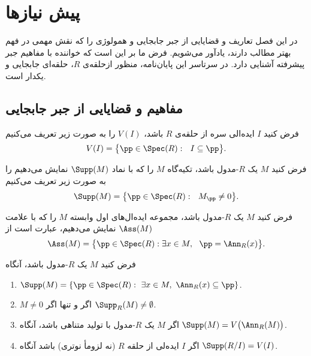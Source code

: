 \chapter{پیش نیازها}
\thispagestyle{empty}
\newpage
در اين فصل تعاریف و قضایایی از جبر جابجایی و همولوژی را که نقش مهمی در فهم بهتر مطالب دارند، یادآور می‌شویم. فرض ما بر این است که خواننده با مفاهیم جبر پیشرفته آشنایی دارد. در سرتاسر اين پايان‌نامه، منظور ازحلقه‌ی
$R$،
حلقه‌ای جابجایی و يكدار است.
\section{{مفاهیم و قضایایی از جبر جابجایی}}
\begin{definition}
فرض کنید $I$ ایده‌الی سره از حلقه‌ی $R$ باشد، $V(I)$ را به صورت زیر تعریف می‌کنیم
$$ V(I)=\big\{{\pp}\in\Spec(R): ~~I\subseteq {\pp}\big\}.$$
\end{definition}
\begin{definition}
فرض کنید $M$ یک $R$-مدول باشد، تکیه‌گاه
$M$
را که با نماد $\Supp(M)$ نمایش می‌دهیم را به صورت زیر تعریف می‌کنیم
$$\Supp(M)=\big\{{\pp}\in \Spec(R): ~~ M_{{\pp}} \neq 0\big\}.$$
\end{definition}
\begin{definition}
فرض کنید $M$ یک $R$-مدول باشد، مجموعه ایده‌ال‌های اول وابسته
$M$
را که با علامت $\Ass(M)$ نمایش می‌دهیم، عبارت است از
$$\Ass(M)=\big\{{\pp}\in \Spec(R): \exists x \in M,~~ {\pp}=\Ann_R(x)\big\}.$$
\end{definition}
\begin{lemma}\label{supp}
فرض کنید $M$ یک $R$‌-‌مدول باشد، آنگاه
\begin{enumerate}
\item
$\Supp(M)=\left\{{\pp}\in \Spec(R):~\exists x\in M,~ \Ann_R(x)\subseteq {\pp}\right\}$.
\item
$M\neq 0$
اگر و تنها اگر $\Supp_R(M)\neq \emptyset$.
\item
اگر $M$ یک $R$-مدول با تولید متناهی باشد، آنگاه
$\Supp(M)=V\big(\Ann_R(M)\big)$.
\item
اگر $I$ ایده‌لی از حلقه $R$ (نه لزومأ نوتری) باشد آنگاه
$\Supp(R/I)=V(I)$.
\end{enumerate}
\end{lemma}
